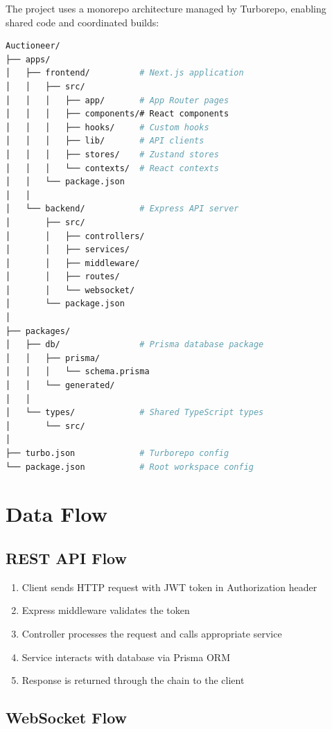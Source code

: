 \documentclass[12pt,a4paper]{report}
\begin{document}
The project uses a monorepo architecture managed by Turborepo, enabling shared code and coordinated builds:

\begin{lstlisting}[language=bash, caption=Project Directory Structure]
Auctioneer/
├── apps/
│   ├── frontend/          # Next.js application
│   │   ├── src/
│   │   │   ├── app/       # App Router pages
│   │   │   ├── components/# React components
│   │   │   ├── hooks/     # Custom hooks
│   │   │   ├── lib/       # API clients
│   │   │   ├── stores/    # Zustand stores
│   │   │   └── contexts/  # React contexts
│   │   └── package.json
│   │
│   └── backend/           # Express API server
│       ├── src/
│       │   ├── controllers/
│       │   ├── services/
│       │   ├── middleware/
│       │   ├── routes/
│       │   └── websocket/
│       └── package.json
│
├── packages/
│   ├── db/                # Prisma database package
│   │   ├── prisma/
│   │   │   └── schema.prisma
│   │   └── generated/
│   │
│   └── types/             # Shared TypeScript types
│       └── src/
│
├── turbo.json             # Turborepo config
└── package.json           # Root workspace config
\end{lstlisting}

\section{Data Flow}

\subsection{REST API Flow}

\begin{enumerate}
    \item Client sends HTTP request with JWT token in Authorization header
    \item Express middleware validates the token
    \item Controller processes the request and calls appropriate service
    \item Service interacts with database via Prisma ORM
    \item Response is returned through the chain to the client
\end{enumerate}

\subsection{WebSocket Flow}
\end{document}
